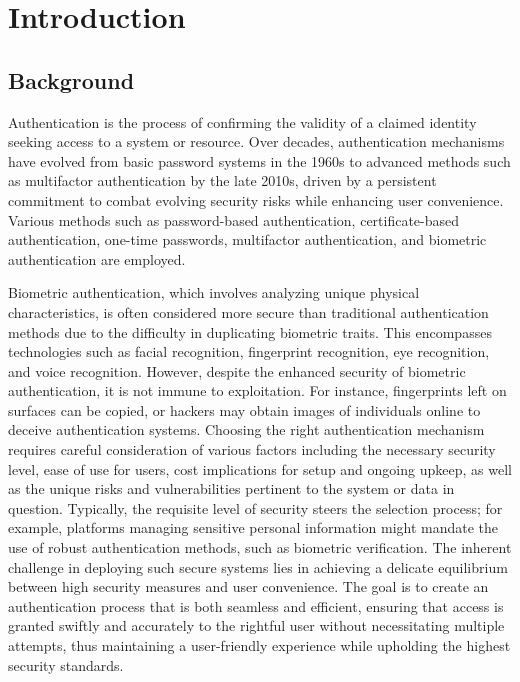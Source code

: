 \section{Introduction}

\subsection{Background}
Authentication is the process of confirming the validity of a claimed identity seeking access to a system or resource. Over decades, authentication mechanisms have evolved from basic password systems in the 1960s to advanced methods such as multifactor authentication by the late 2010s, driven by a persistent commitment to combat evolving security risks while enhancing user convenience\cite{ref1}. Various methods such as password-based authentication, certificate-based authentication, one-time passwords, multifactor authentication, and biometric authentication are employed\cite{ref2}.

Biometric authentication, which involves analyzing unique physical characteristics, is often considered more secure than traditional authentication methods due to the difficulty in duplicating biometric traits. This encompasses technologies such as facial recognition, fingerprint recognition, eye recognition, and voice recognition\cite{ref3}.
However, despite the enhanced security of biometric authentication, it is not immune to exploitation. For instance, fingerprints left on surfaces can be copied, or hackers may obtain images of individuals online to deceive authentication systems.
Choosing the right authentication mechanism requires careful consideration of various factors including the necessary security level, ease of use for users, cost implications for setup and ongoing upkeep, as well as the unique risks and vulnerabilities pertinent to the system or data in question. Typically, the requisite level of security steers the selection process; for example, platforms managing sensitive personal information might mandate the use of robust authentication methods, such as biometric verification. The inherent challenge in deploying such secure systems lies in achieving a delicate equilibrium between high security measures and user convenience. The goal is to create an authentication process that is both seamless and efficient, ensuring that access is granted swiftly and accurately to the rightful user without necessitating multiple attempts, thus maintaining a user-friendly experience while upholding the highest security standards.

